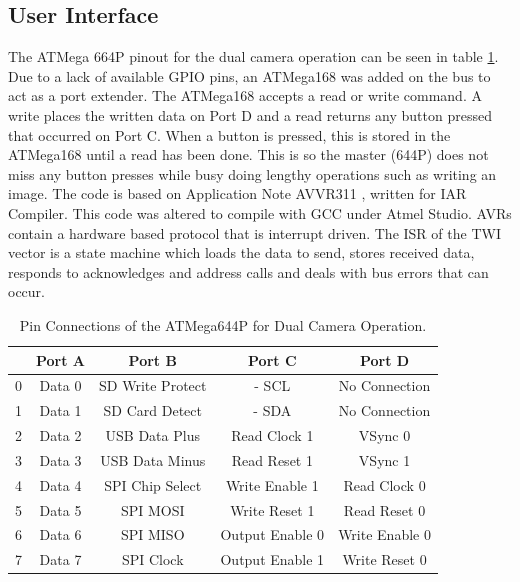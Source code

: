 \subsection{User Interface}
The ATMega 664P pinout for the dual camera operation can be seen in table \ref{table:644Pin}. Due to a lack of available GPIO pins, an ATMega168 was added on the \itc bus to act as a port extender. The ATMega168 accepts a read or write command. A write places the written data on Port D and a read returns any button pressed that occurred on Port C. When a button is pressed, this is stored in the ATMega168 until a read has been done. This is so the master (644P) does not miss any button presses while busy doing lengthy operations such as writing an image. The code is based on Application Note AVVR311 \citep{Atmel:I2CSlave}, written for IAR Compiler. This code was altered to compile with GCC under Atmel Studio. AVRs contain a hardware based \itc protocol that is interrupt driven. The ISR of the TWI vector is a state machine which loads the data to send, stores received data, responds to acknowledges and address calls and deals with bus errors that can occur.

\begin{table}
\centering
\begin{tabular}{|c|c|c|c|c|}\hline
	& 	Port A 	& 	Port B 			& 	Port C 				& 	Port D 		\\ \hline
0	&	Data 0	&	SD Write Protect&	\itc - SCL			&	No Connection	\\
1	&	Data 1	&	SD Card Detect	&	\itc - SDA			&	No Connection	\\
2	&	Data 2	&	USB Data Plus	&	Read Clock 1		&	VSync 0			\\
3	&	Data 3	&	USB Data Minus	&	Read Reset 1		&	VSync 1			\\
4	&	Data 4	&	SPI Chip Select	&	Write Enable 1		&	Read Clock 0	\\
5	&	Data 5	&	SPI	MOSI 		&	Write Reset 1		&	Read Reset 0	\\
6	&	Data 6	&	SPI MISO		&	Output Enable 0		&	Write Enable 0	\\
7	&	Data 7	&	SPI Clock		&	Output Enable 1		&	Write Reset 0	\\
\hline

\end{tabular}
\caption{Pin Connections of the ATMega644P for Dual Camera Operation.}
\label{table:644Pin}
\end{table}

